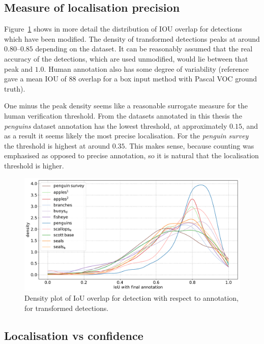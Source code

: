 \subsection {Measure of localisation precision}
\label{sec:localisation_precision}

Figure~\ref{fig:density_iou} shows in more detail the distribution of \gls{IOU} overlap for detections which have been modified. The density of transformed detections peaks at around $0.80$--$0.85$ depending on the dataset. It can be reasonably assumed that the real accuracy of the detections, which are used unmodified, would lie between that peak and $1.0$. Human annotation also has some degree of variability (reference \cite{Papadopoulos2017} gave a mean \gls{IOU} of 88 overlap for a box input method with Pascal VOC ground truth).

One minus the peak density seems like a reasonable surrogate measure for the human verification threshold. From the datasets annotated in this thesis the \emph{penguins} dataset annotation has the lowest threshold, at approximately $0.15$, and as a result it seems likely the most precise localisation. For the \emph{penguin survey} the threshold is highest at around $0.35$. This makes sense, because counting was emphasised as opposed to precise annotation, so it is natural that the localisation threshold is higher. 


\begin{figure}[ht]
\centering
\includegraphics[width=1.0\linewidth]{charts/scatters/iou_dataset.pdf}
\caption{ Density plot of IoU overlap for detection with respect to annotation, for transformed detections. }
\label{fig:density_iou}
\end{figure}


\subsection{Localisation vs confidence}
\label{sec:localisation_confidence}

